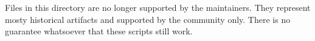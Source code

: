 Files in this directory are no longer supported by the maintainers. They represent mosty historical artifacts and supported by the community only. There is no guarantee whatsoever that these scripts still work. 